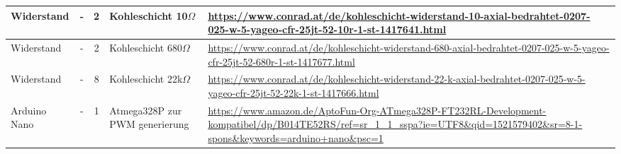\begin{tiny}
\begin{center}
\begin{tabular}{|p{2cm}|c|c|p{3cm}|p{7cm}|}
Widerstand & - & 2 & Kohleschicht 10$\Omega$ & \url{https://www.conrad.at/de/kohleschicht-widerstand-10-axial-bedrahtet-0207-025-w-5-yageo-cfr-25jt-52-10r-1-st-1417641.html} \\ \hline
Widerstand & - & 2 & Kohleschicht 680$\Omega$ & \url{https://www.conrad.at/de/kohleschicht-widerstand-680-axial-bedrahtet-0207-025-w-5-yageo-cfr-25jt-52-680r-1-st-1417677.html} \\ \hline
Widerstand & - & 8 & Kohleschicht 22k$\Omega$ & \url{https://www.conrad.at/de/kohleschicht-widerstand-22-k-axial-bedrahtet-0207-025-w-5-yageo-cfr-25jt-52-22k-1-st-1417666.html} \\ \hline
Arduino Nano & - & 1 & Atmega328P zur PWM generierung & \url{https://www.amazon.de/AptoFun-Org-ATmega328P-FT232RL-Development-kompatibel/dp/B014TE52RS/ref=sr_1_1_sspa?ie=UTF8&qid=1521579402&sr=8-1-spons&keywords=arduino+nano&psc=1} \\ \hline
\end{tabular}
\end{center}
\end{tiny}